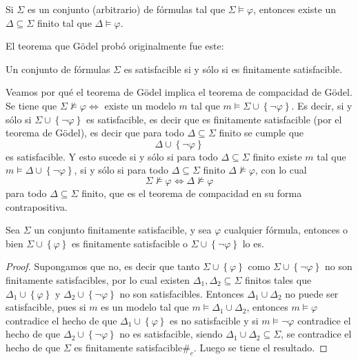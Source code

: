 \documentclass[12pt]{report}
\theoremstyle{largebreak}
\begin{document}
    \begin{theor}
        Si $\Sigma$ es un conjunto (arbitrario) de fórmulas tal que $\Sigma\vDash\varphi$, entonces existe un $\Delta\subseteq\Sigma$ finito tal que $\Delta\vDash\varphi$.
    \end{theor}

    El teorema que Gödel probó originalmente fue este:

    \begin{theor}
        Un conjunto de fórmulas $\Sigma$ es satisfacible si y sólo si es finitamente satisfacible.
    \end{theor}

    Veamos por qué el teorema de Gödel implica el teorema de compacidad de Gödel. Se tiene que $\Sigma\nvDash\varphi\iff$ existe un modelo $m$ tal que $m\vDash\Sigma\cup\left\{\neg\varphi \right\}$. Es decir, si y sólo si $\Sigma\cup\left\{\neg\varphi \right\}$ es satisfacible, es decir que es finitamente satisfacible (por el teorema de Gödel), es decir que para todo $\Delta\subseteq\Sigma$ finito se cumple que
    \begin{equation*}
        \Delta\cup\left\{\neg\varphi \right\}
    \end{equation*}
    es satisfacible. Y esto sucede si y sólo si para todo $\Delta\subseteq\Sigma$ finito existe $m$ tal que $m\vDash\Delta\cup\left\{\neg\varphi \right\}$, si y sólo si para todo $\Delta\subseteq\Sigma$ finito $\Delta\nvDash\varphi$, con lo cual
    \begin{equation*}
        \Sigma\nvDash\varphi\iff\Delta\nvDash\varphi
    \end{equation*}
    para todo $\Delta\subseteq\Sigma$ finito, que es el teorema de compacidad en su forma contrapositiva.

    \begin{lema}
        Sea $\Sigma$ un conjunto finitamente satisfacible, y sea $\varphi$ cualquier fórmula, entonces o bien $\Sigma\cup\left\{\varphi\right\}$ es finitamente satisfacible o $\Sigma\cup\left\{\neg\varphi\right\}$ lo es.
    \end{lema}

    \begin{proof}
        Supongamos que no, es decir que tanto $\Sigma\cup\left\{\varphi\right\}$ como $\Sigma\cup\left\{\neg\varphi\right\}$ no son finitamente satisfacibles, por lo cual existen $\Delta_1,\Delta_2\subseteq\Sigma$ finitos tales que $\Delta_1\cup\left\{\varphi \right\}$ y $\Delta_2\cup\left\{\neg\varphi \right\}$ no son satisfacibles.
        Entonces $\Delta_1\cup\Delta_2$ no puede ser satisfacible, pues si $m$ es un modelo tal que $m\vDash\Delta_1\cup\Delta_2$, entonces $m\vDash\varphi$ contradice el hecho de que $\Delta_1\cup\left\{\varphi \right\}$ es no satisfacible y si $m\vDash\neg\varphi$ contradice el hecho de que $\Delta_2\cup\left\{\neg\varphi \right\}$ no es satisfacible, siendo $\Delta_1\cup\Delta_2\subseteq\Sigma$, se contradice el hecho de que $\Sigma$ es finitamente satisfacible$\#_c$. Luego se tiene el resultado.
    \end{proof}
\end{document}
